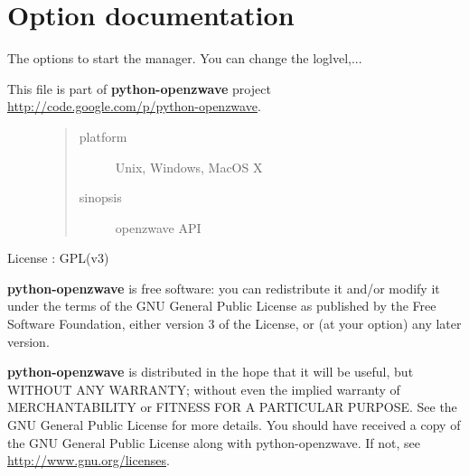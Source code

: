 \documentclass[letterpaper,10pt,english]{sphinxmanual}
\begin{document}
\section{Option documentation}
\label{option::doc}\label{option:option-documentation}
The options to start the manager. You can change the loglvel,...
\label{option:module-openzwave.option}\label{option:module-openzwave.option}\begin{description}
\item[{This file is part of \textbf{python-openzwave} project \href{http://code.google.com/p/python-openzwave}{http://code.google.com/p/python-openzwave}.}] \leavevmode\begin{quote}\begin{description}
\item[{platform}] \leavevmode
Unix, Windows, MacOS X

\item[{sinopsis}] \leavevmode
openzwave API

\end{description}\end{quote}

\end{description}

License : GPL(v3)

\textbf{python-openzwave} is free software: you can redistribute it and/or modify
it under the terms of the GNU General Public License as published by
the Free Software Foundation, either version 3 of the License, or
(at your option) any later version.

\textbf{python-openzwave} is distributed in the hope that it will be useful,
but WITHOUT ANY WARRANTY; without even the implied warranty of
MERCHANTABILITY or FITNESS FOR A PARTICULAR PURPOSE. See the
GNU General Public License for more details.
You should have received a copy of the GNU General Public License
along with python-openzwave. If not, see \href{http://www.gnu.org/licenses}{http://www.gnu.org/licenses}.
\end{document}
